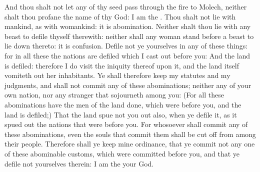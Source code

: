 \begin{biblechapter}
\verse And thou shalt not let any of thy seed pass through the fire to Molech, neither shalt thou profane the name of thy God: I am the \LORD.
\verse Thou shalt not lie with mankind, as with womankind: it is abomination.
\verse Neither shalt thou lie with any beast to defile thyself therewith: neither shall any woman stand before a beast to lie down thereto: it is confusion.
\verse Defile not ye yourselves in any of these things: for in all these the nations are defiled which I cast out before you:
\verse And the land is defiled: therefore I do visit the iniquity thereof upon it, and the land itself vomiteth out her inhabitants.
\verse Ye shall therefore keep my statutes and my judgments, and shall not commit any of these abominations; neither any of your own nation, nor any stranger that sojourneth among you:
\verse (For all these abominations have the men of the land done, which were before you, and the land is defiled;)
\verse That the land spue not you out also, when ye defile it, as it spued out the nations that were before you.
\verse For whosoever shall commit any of these abominations, even the souls that commit them shall be cut off from among their people.
\verse Therefore shall ye keep mine ordinance, that ye commit not any one of these abominable customs, which were committed before you, and that ye defile not yourselves therein: I am the \LORD your God.
\end{biblechapter}

\columnbreak %

